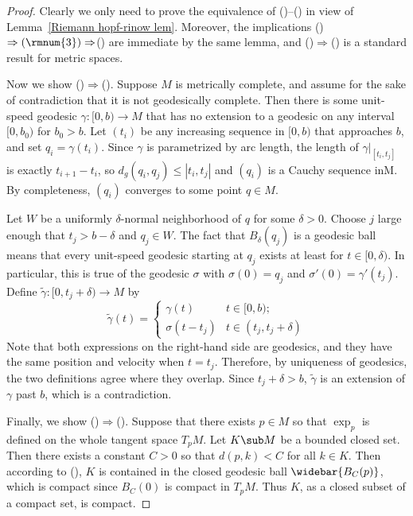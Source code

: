 \begin{proof}
Clearly we only need to prove the equivalence of ()--() in view of Lemma~\ref{Riemann hopf-rinow lem}. Moreover, the implications ()$\Rightarrow(\rmnum{3})\Rightarrow$() are immediate by the same lemma, and ()$\Rightarrow$() is a standard result for metric spaces.\par
Now we show ()$\Rightarrow$(). Suppose $M$ is metrically complete, and assume for the sake of contradiction that it is not geodesically complete. Then 
there is some unit-speed geodesic $\gamma:[0,b)\to M$ that has no extension to a geodesic on any interval $[0,b_0)$ for $b_0>b$. Let $(t_i)$ be any increasing sequence 
in $[0,b)$ that approaches $b$, and set $q_i=\gamma(t_i)$. Since $\gamma$ is parametrized by arc length, the length of $\gamma|_{[t_i,t_{j}]}$ is exactly $t_{i+1}-t_i$, 
so $d_g(q_i,q_j)\leq|t_i,t_j|$ and $(q_i)$ is a Cauchy sequence inM. By completeness, $(q_i)$ converges to some point $q\in M$.\par
Let $W$ be a uniformly $\delta$-normal neighborhood of $q$ for some $\delta>0$. Choose $j$ large enough that $t_j>b-\delta$ and $q_j\in W$. The fact that $B_{\delta}(q_j)$ 
is a geodesic ball means that every unit-speed geodesic starting at $q_j$ exists at least for $t\in[0,\delta)$. In particular, this is true of the geodesic $\sigma$ with 
$\sigma(0)=q_j$ and $\sigma'(0)=\gamma'(t_j)$. Define $\tilde{\gamma}:[0,t_j+\delta)\to M$ by
\[\tilde{\gamma}(t)=\begin{cases}
\gamma(t)&t\in[0,b);\\
\sigma(t-t_j)&t\in(t_j,t_j+\delta)
\end{cases}\]
Note that both expressions on the right-hand side are geodesics, and they have the same position and velocity when $t=t_j$. Therefore, by uniqueness of geodesics, the 
two definitions agree where they overlap. Since $t_j+\delta>b$, $\tilde{\gamma}$ is an extension of $\gamma$ past $b$, which is a contradiction.\par
Finally, we show ()$\Rightarrow$(). Suppose that there exists $p\in M$ so that $\exp_p$ is defined on the whole tangent space $T_pM$. Let $K\sub M$ be 
a bounded closed set. Then there exists a constant $C>0$ so that $d(p,k)<C$ for all $k\in K$. Then according to (), $K$ is contained in the closed geodesic ball 
$\widebar{B_{C}(p)}$, which is compact since $B_{C}(0)$ is compact in $T_pM$. Thus $K$, as a closed subset of a compact set, is compact.
\end{proof}
